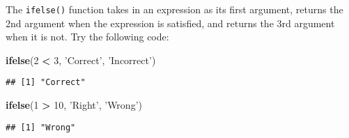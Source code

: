 \documentclass[
]{article}
\newenvironment{Shaded}{\begin{snugshade}}{\end{snugshade}}
\newcommand{\DecValTok}[1]{\textcolor[rgb]{0.00,0.00,0.81}{#1}}
\newcommand{\KeywordTok}[1]{\textcolor[rgb]{0.13,0.29,0.53}{\textbf{#1}}}
\newcommand{\NormalTok}[1]{#1}
\newcommand{\OperatorTok}[1]{\textcolor[rgb]{0.81,0.36,0.00}{\textbf{#1}}}
\newcommand{\StringTok}[1]{\textcolor[rgb]{0.31,0.60,0.02}{#1}}
\begin{document}
The \texttt{ifelse()} function takes in an expression as its first
argument, returns the 2nd argument when the expression is satisfied, and
returns the 3rd argument when it is not. Try the following code:

\begin{Shaded}
\begin{Highlighting}[]
\KeywordTok{ifelse}\NormalTok{(}\DecValTok{2} \OperatorTok{<}\StringTok{ }\DecValTok{3}\NormalTok{, }\StringTok{'Correct'}\NormalTok{, }\StringTok{'Incorrect'}\NormalTok{)}
\end{Highlighting}
\end{Shaded}

\begin{verbatim}
## [1] "Correct"
\end{verbatim}

\begin{Shaded}
\begin{Highlighting}[]
\KeywordTok{ifelse}\NormalTok{(}\DecValTok{1} \OperatorTok{>}\StringTok{ }\DecValTok{10}\NormalTok{, }\StringTok{'Right'}\NormalTok{, }\StringTok{'Wrong'}\NormalTok{)}
\end{Highlighting}
\end{Shaded}

\begin{verbatim}
## [1] "Wrong"
\end{verbatim}
\end{document}
